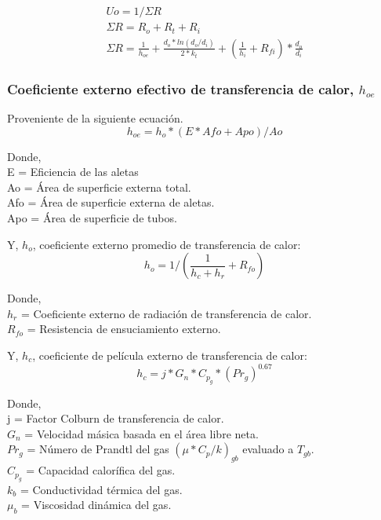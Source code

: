 \begin{gather*}
\label{}
Uo  = 1 / \Sigma R \\
\Sigma R = R_o + R_t + R_i \\
\Sigma R =  \frac{1}{h_{oe}} 
            +\frac{d_o*ln(d_o/d_i)}{2*k_t} 
            +(\frac{1}{h_i}+R_{fi})*\frac{d_o}{d_i} 
\end{gather*}

\subsubsection{Coeficiente externo efectivo de transferencia de calor, $h_{oe}$}
\par Proveniente de la siguiente ecuación.
\begin{equation*}
h_{oe} = h_o * (E *Afo +Apo) / Ao
\end{equation*}

\par Donde,\\
E = Eficiencia de las aletas\\
Ao = Área de superficie externa total.\\
Afo = Área de superficie externa de aletas. \\
Apo = Área de superficie de tubos. \\

\par Y, $h_o$, coeficiente externo promedio de transferencia de calor: 
\begin{equation*}
h_o = 1/(\frac{1}{h_c+h_r}+R_{fo})
\end{equation*}

\par Donde,\\
$h_r$ = Coeficiente externo de radiación de transferencia de calor.\\
$R_{fo}$ = Resistencia de ensuciamiento externo. \\

\par Y, $h_c$, coeficiente de película externo de transferencia de calor: 
\begin{equation*}
h_c = j *G_n *C_{p_g} *(Pr_g)^{0.67}
\end{equation*}

\par Donde,\\
j = Factor Colburn de transferencia de calor.\\
$G_n$ = Velocidad másica basada en el área libre neta.\\
$Pr_g$ = Número de Prandtl del gas $(\mu*C_p /k)_{gb}$ evaluado a $T_{gb}$.\\
$C_{p_g}$ = Capacidad calorífica del gas.\\
$k_b$ = Conductividad térmica del gas.\\
$\mu_b$ = Viscosidad dinámica del gas.\\

